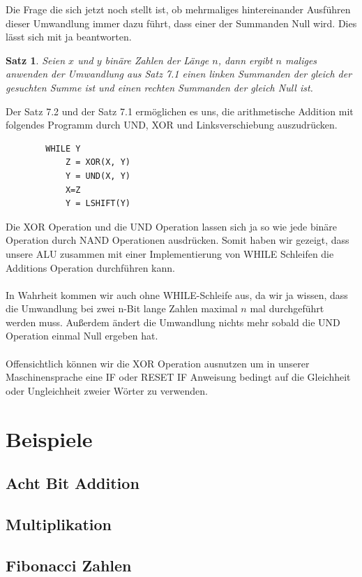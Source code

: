 \documentclass[11pt,a4paper,leqno]{report}
\newtheorem{proposition}{Satz}[chapter]
\numberwithin{equation}{chapter}
\begin{document}
\noindent
Die Frage die sich jetzt noch stellt ist, ob mehrmaliges hintereinander Ausf\"uhren dieser Umwandlung immer dazu f\"uhrt, dass einer der Summanden Null wird. Dies l\"asst sich mit ja beantworten.
\begin{proposition}
	Seien $x$ und $y$ bin\"are Zahlen der L\"ange $n$, dann ergibt $n$ maliges anwenden der Umwandlung aus Satz 7.1 einen linken Summanden der gleich der gesuchten Summe ist und einen rechten Summanden der gleich Null ist.
\end{proposition}
\noindent
Der Satz 7.2 und der Satz 7.1 erm\"oglichen es uns, die arithmetische Addition mit folgendes Programm durch UND, XOR und Linksverschiebung auszudr\"ucken.
\begin{lstlisting}
		WHILE Y
			Z = XOR(X, Y)
			Y = UND(X, Y)
			X=Z
			Y = LSHIFT(Y)
\end{lstlisting}
Die XOR Operation und die UND Operation lassen sich ja so wie jede bin\"are Operation durch NAND Operationen ausdr\"ucken. Somit haben wir gezeigt, dass unsere ALU zusammen mit einer Implementierung von WHILE Schleifen die Additions Operation durchf\"uhren kann.\\
\\
In Wahrheit kommen wir auch ohne WHILE-Schleife aus, da wir ja wissen, dass die Umwandlung bei zwei n-Bit lange Zahlen maximal $n$ mal durchgef\"uhrt werden muss. Au\ss{}erdem \"andert die Umwandlung nichts mehr sobald die UND Operation einmal Null ergeben hat.\\
\\
Offensichtlich k\"onnen wir die XOR Operation ausnutzen um in unserer Maschinensprache eine IF oder RESET IF Anweisung bedingt auf die Gleichheit oder Ungleichheit zweier W\"orter zu verwenden.
\section{Beispiele}
\subsection{Acht Bit Addition}
\subsection{Multiplikation}
\subsection{Fibonacci Zahlen}
\end{document}
